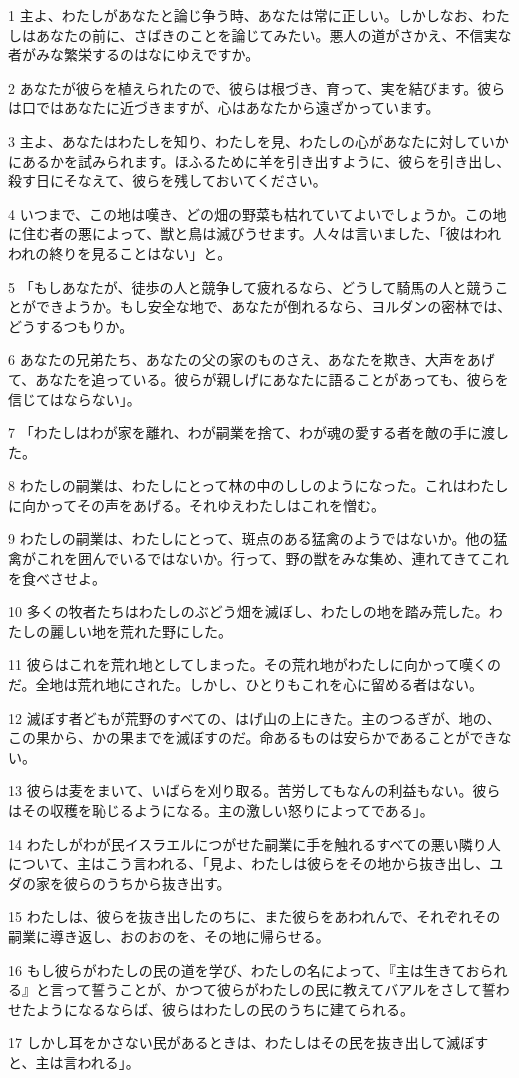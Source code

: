 \par 1 主よ、わたしがあなたと論じ争う時、あなたは常に正しい。しかしなお、わたしはあなたの前に、さばきのことを論じてみたい。悪人の道がさかえ、不信実な者がみな繁栄するのはなにゆえですか。
\par 2 あなたが彼らを植えられたので、彼らは根づき、育って、実を結びます。彼らは口ではあなたに近づきますが、心はあなたから遠ざかっています。
\par 3 主よ、あなたはわたしを知り、わたしを見、わたしの心があなたに対していかにあるかを試みられます。ほふるために羊を引き出すように、彼らを引き出し、殺す日にそなえて、彼らを残しておいてください。
\par 4 いつまで、この地は嘆き、どの畑の野菜も枯れていてよいでしょうか。この地に住む者の悪によって、獣と鳥は滅びうせます。人々は言いました、「彼はわれわれの終りを見ることはない」と。
\par 5 「もしあなたが、徒歩の人と競争して疲れるなら、どうして騎馬の人と競うことができようか。もし安全な地で、あなたが倒れるなら、ヨルダンの密林では、どうするつもりか。
\par 6 あなたの兄弟たち、あなたの父の家のものさえ、あなたを欺き、大声をあげて、あなたを追っている。彼らが親しげにあなたに語ることがあっても、彼らを信じてはならない」。
\par 7 「わたしはわが家を離れ、わが嗣業を捨て、わが魂の愛する者を敵の手に渡した。
\par 8 わたしの嗣業は、わたしにとって林の中のししのようになった。これはわたしに向かってその声をあげる。それゆえわたしはこれを憎む。
\par 9 わたしの嗣業は、わたしにとって、斑点のある猛禽のようではないか。他の猛禽がこれを囲んでいるではないか。行って、野の獣をみな集め、連れてきてこれを食べさせよ。
\par 10 多くの牧者たちはわたしのぶどう畑を滅ぼし、わたしの地を踏み荒した。わたしの麗しい地を荒れた野にした。
\par 11 彼らはこれを荒れ地としてしまった。その荒れ地がわたしに向かって嘆くのだ。全地は荒れ地にされた。しかし、ひとりもこれを心に留める者はない。
\par 12 滅ぼす者どもが荒野のすべての、はげ山の上にきた。主のつるぎが、地の、この果から、かの果までを滅ぼすのだ。命あるものは安らかであることができない。
\par 13 彼らは麦をまいて、いばらを刈り取る。苦労してもなんの利益もない。彼らはその収穫を恥じるようになる。主の激しい怒りによってである」。
\par 14 わたしがわが民イスラエルにつがせた嗣業に手を触れるすべての悪い隣り人について、主はこう言われる、「見よ、わたしは彼らをその地から抜き出し、ユダの家を彼らのうちから抜き出す。
\par 15 わたしは、彼らを抜き出したのちに、また彼らをあわれんで、それぞれその嗣業に導き返し、おのおのを、その地に帰らせる。
\par 16 もし彼らがわたしの民の道を学び、わたしの名によって、『主は生きておられる』と言って誓うことが、かつて彼らがわたしの民に教えてバアルをさして誓わせたようになるならば、彼らはわたしの民のうちに建てられる。
\par 17 しかし耳をかさない民があるときは、わたしはその民を抜き出して滅ぼすと、主は言われる」。

